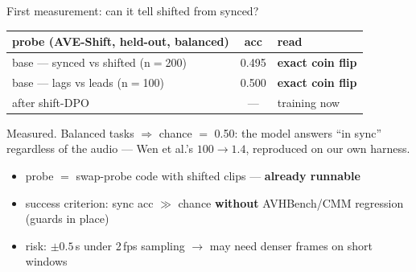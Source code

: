 \documentclass[aspectratio=169,11pt]{beamer}
\begin{document}
\begin{frame}{First measurement: can it tell shifted from synced?}
\centering\small
\renewcommand{\arraystretch}{1.2}
\begin{tabular}{l c l}
\toprule
probe (AVE-Shift, held-out, balanced) & acc & read \\
\midrule
base --- synced vs shifted (n$=$200) & 0.495 & \textbf{exact coin flip} \\ %
base --- lags vs leads (n$=$100)     & 0.500 & \textbf{exact coin flip} \\ %
after shift-DPO & --- & training now \\
\bottomrule
\end{tabular}
\par\vspace{0.2em}
{\scriptsize Measured. Balanced tasks $\Rightarrow$ chance $=$ 0.50: the model answers ``in sync''
regardless of the audio --- Wen et al.'s $100\to1.4$, reproduced on our own harness.}
\vfill
\begin{itemize}\footnotesize
\item probe $=$ swap-probe code with shifted clips --- \textbf{already runnable}
\item success criterion: sync acc $\gg$ chance \textbf{without} AVHBench/CMM regression (guards in place)
\item risk: $\pm0.5$\,s under 2\,fps sampling $\to$ may need denser frames on short windows
\end{itemize}
\end{frame}
\end{document}
